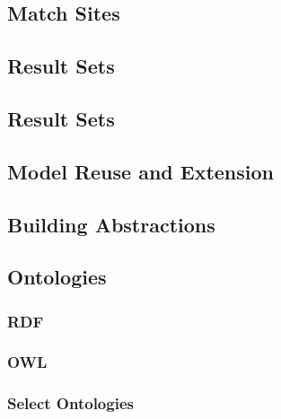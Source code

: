 \subsection{Match Sites}



\subsection{Result Sets}



\subsection{Result Sets}

\subsection{Model Reuse and Extension}



\subsection{Building Abstractions}



\subsection{Ontologies}
\subsubsection{RDF}
\subsubsection{OWL}
\subsubsection{Select Ontologies}

